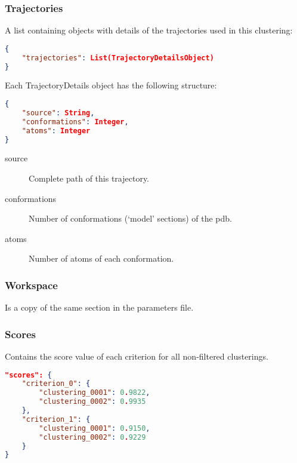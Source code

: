 \subsubsection{Trajectories}

A list containing objects with details of the trajectories used in
this clustering:

\begin{lstlisting}[caption={The trajectory details section of results file},firstnumber=1,language=json]
{
	"trajectories": List(TrajectoryDetailsObject)
}

\end{lstlisting}

Each TrajectoryDetails object has the following structure:

\begin{lstlisting}[caption={TrajectoryDetails object},firstnumber=1,language=json]
{
	"source": String,
	"conformations": Integer,
	"atoms": Integer
}
\end{lstlisting}

\begin{description}
\item [{source}] Complete path of this trajectory.
\item [{conformations}] Number of conformations (`model' sections) of
the pdb.
\item [{atoms}] Number of atoms of each conformation.
\end{description}

\subsubsection{Workspace}

Is a copy of the same section in the parameters file.

\subsubsection{Scores}

Contains the score value of each criterion for all non-filtered clusterings.

\begin{lstlisting}[caption={Possible score section for a clustering process that used two criteria and ended with two candidates},firstnumber=1,language=json] 
"scores": {
	"criterion_0": {
		"clustering_0001": 0.9822,
		"clustering_0002": 0.9935
	},
	"criterion_1": {
		"clustering_0001": 0.9150,
		"clustering_0002": 0.9229
	}
} 
\end{lstlisting}


